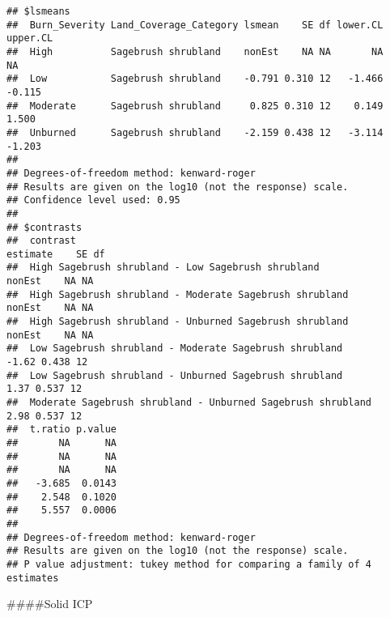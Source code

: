 \documentclass[
]{article}
\begin{document}
\begin{verbatim}
## $lsmeans
##  Burn_Severity Land_Coverage_Category lsmean    SE df lower.CL upper.CL
##  High          Sagebrush shrubland    nonEst    NA NA       NA       NA
##  Low           Sagebrush shrubland    -0.791 0.310 12   -1.466   -0.115
##  Moderate      Sagebrush shrubland     0.825 0.310 12    0.149    1.500
##  Unburned      Sagebrush shrubland    -2.159 0.438 12   -3.114   -1.203
## 
## Degrees-of-freedom method: kenward-roger 
## Results are given on the log10 (not the response) scale. 
## Confidence level used: 0.95 
## 
## $contrasts
##  contrast                                                    estimate    SE df
##  High Sagebrush shrubland - Low Sagebrush shrubland            nonEst    NA NA
##  High Sagebrush shrubland - Moderate Sagebrush shrubland       nonEst    NA NA
##  High Sagebrush shrubland - Unburned Sagebrush shrubland       nonEst    NA NA
##  Low Sagebrush shrubland - Moderate Sagebrush shrubland         -1.62 0.438 12
##  Low Sagebrush shrubland - Unburned Sagebrush shrubland          1.37 0.537 12
##  Moderate Sagebrush shrubland - Unburned Sagebrush shrubland     2.98 0.537 12
##  t.ratio p.value
##       NA      NA
##       NA      NA
##       NA      NA
##   -3.685  0.0143
##    2.548  0.1020
##    5.557  0.0006
## 
## Degrees-of-freedom method: kenward-roger 
## Results are given on the log10 (not the response) scale. 
## P value adjustment: tukey method for comparing a family of 4 estimates
\end{verbatim}

\#\#\#\#Solid ICP
\end{document}
